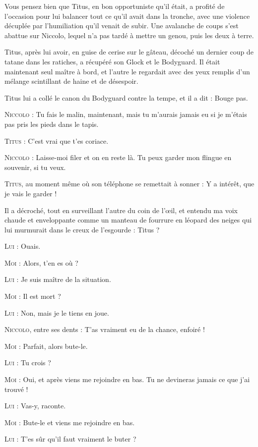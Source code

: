 Vous pensez bien que Titus, en bon opportuniste qu’il était, a profité de l’occasion pour lui balancer tout ce qu’il avait dans la tronche, avec une violence décuplée par l’humiliation qu’il venait de subir. Une avalanche de coups s’est abattue sur Niccolo, lequel n’a pas tardé à mettre un genou, puis les deux à terre.

Titus, après lui avoir, en guise de cerise sur le gâteau, décoché un dernier coup de tatane dans les ratiches, a récupéré son Glock et le Bodyguard. Il était maintenant seul maître à bord, et l’autre le regardait avec des yeux remplis d’un mélange scintillant de haine et de désespoir.

Titus lui a collé le canon du Bodyguard contre la tempe, et il a dit : Bouge pas.

\textsc{Niccolo} : Tu fais le malin, maintenant, mais tu m’aurais jamais eu si je m’étais pas pris les pieds dans le tapis.

\textsc{Titus} : C’est vrai que t’es coriace.

\textsc{Niccolo} : Laisse-moi filer et on en reste là. Tu peux garder mon flingue en souvenir, si tu veux.

\textsc{Titus}, au moment même où son téléphone se remettait à sonner : Y a intérêt, que je vais le garder !

Il a décroché, tout en surveillant l’autre du coin de l’œil, et entendu ma voix chaude et enveloppante comme un manteau de fourrure en léopard des neiges qui lui murmurait dans le creux de l’esgourde : Titus ?

\textsc{Lui} : Ouais.

\textsc{Moi} : Alors, t’en es où ?

\textsc{Lui} : Je suis maître de la situation.

\textsc{Moi} : Il est mort ?

\textsc{Lui} : Non, mais je le tiens en joue.

\textsc{Niccolo}, entre ses dents : T’as vraiment eu de la chance, enfoiré !

\textsc{Moi} : Parfait, alors bute-le.

\textsc{Lui} : Tu crois ?

\textsc{Moi} : Oui, et après viens me rejoindre en bas. Tu ne devineras jamais ce que j’ai trouvé !

\textsc{Lui} : Vas-y, raconte.

\textsc{Moi} : Bute-le et viens me rejoindre en bas.

\textsc{Lui} : T’es sûr qu’il faut vraiment le buter ?

